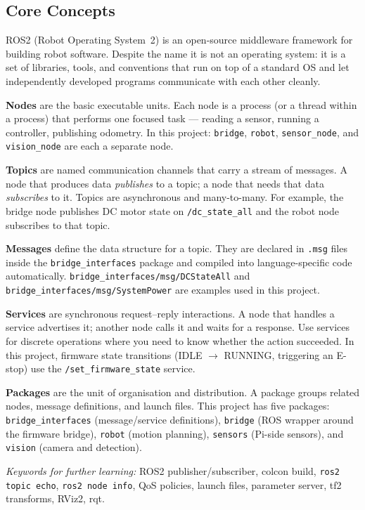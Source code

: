 \documentclass{ol-softwaremanual}
\begin{document}
\subsection{Core Concepts}

ROS2 (Robot Operating System~2) is an open-source middleware framework for building
robot software.
Despite the name it is not an operating system: it is a set of libraries, tools, and
conventions that run on top of a standard OS and let independently developed programs
communicate with each other cleanly.

\textbf{Nodes} are the basic executable units.
Each node is a process (or a thread within a process) that performs one focused task ---
reading a sensor, running a controller, publishing odometry.
In this project: \texttt{bridge}, \texttt{robot}, \texttt{sensor\_node}, and
\texttt{vision\_node} are each a separate node.

\textbf{Topics} are named communication channels that carry a stream of messages.
A node that produces data \emph{publishes} to a topic; a node that needs that data
\emph{subscribes} to it.
Topics are asynchronous and many-to-many.
For example, the bridge node publishes DC motor state on \texttt{/dc\_state\_all}
and the robot node subscribes to that topic.

\textbf{Messages} define the data structure for a topic.
They are declared in \texttt{.msg} files inside the \texttt{bridge\_interfaces} package
and compiled into language-specific code automatically.
\texttt{bridge\_interfaces/msg/DCStateAll} and \texttt{bridge\_interfaces/msg/SystemPower}
are examples used in this project.

\textbf{Services} are synchronous request--reply interactions.
A node that handles a service advertises it; another node calls it and waits for
a response.
Use services for discrete operations where you need to know whether the action
succeeded.
In this project, firmware state transitions (IDLE $\to$ RUNNING, triggering an E-stop)
use the \texttt{/set\_firmware\_state} service.

\textbf{Packages} are the unit of organisation and distribution.
A package groups related nodes, message definitions, and launch files.
This project has five packages:
\texttt{bridge\_interfaces} (message/service definitions),
\texttt{bridge} (ROS wrapper around the firmware bridge),
\texttt{robot} (motion planning),
\texttt{sensors} (Pi-side sensors), and
\texttt{vision} (camera and detection).

\medskip
\noindent\textit{Keywords for further learning:}
ROS2 publisher/subscriber, colcon build, \texttt{ros2 topic echo}, \texttt{ros2 node info},
QoS policies, launch files, parameter server, tf2 transforms, RViz2, rqt.
\end{document}
